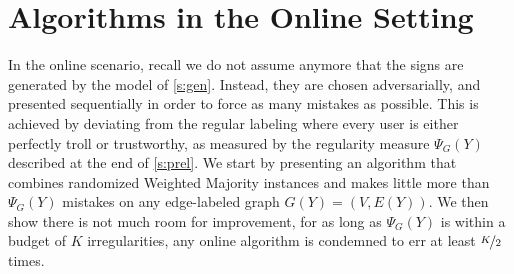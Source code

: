\section{Algorithms in the Online Setting}\label{s:algonline}

In the online scenario, recall we do not assume anymore that the signs are generated by the model of
\autoref{s:gen}. Instead, they are chosen adversarially, and presented sequentially in order to
force as many mistakes as possible. This is achieved by deviating from the regular labeling where
every user is either perfectly troll or trustworthy, as measured by the regularity measure
$\Psi_G(Y)$ described at the end of \autoref{s:prel}. We start by presenting an algorithm that
combines randomized Weighted Majority instances and makes little more than $\Psi_G(Y)$ mistakes on
any edge-labeled graph $G(Y) = (V,E(Y))$.  We then show there is not much room for improvement, for
as long as $\Psi_G(Y)$ is within a budget of $K$ irregularities, any online algorithm is condemned
to err at least $\nicefrac{K}{2}$ times.

